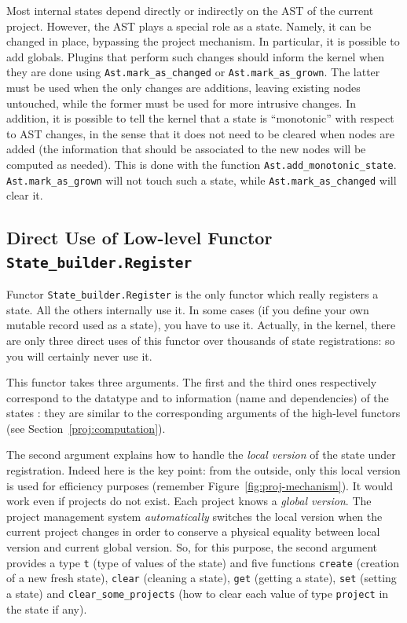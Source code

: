 Most internal states depend directly or indirectly on the AST of the current
project. However, the AST plays a special role as a state. Namely, it can be
changed in place, bypassing the project mechanism. In particular, it is possible
to add globals. Plugins that perform such changes should inform the kernel
when they are done using
\texttt{Ast.mark\_as\_changed} or 
\texttt{Ast.mark\_as\_grown}. The latter
must be used when the only changes are additions, leaving existing nodes
untouched, while the former must be used for more intrusive changes.
In addition, it is possible to tell the kernel that a state is ``monotonic''
with respect to AST changes, in the sense that it does not need to be cleared
when nodes are added (the information that should be associated to the new 
nodes will be computed as needed). This is done with the function
\texttt{Ast.add\_monotonic\_state}.
\texttt{Ast.mark\_as\_grown} will not touch such a state, while
\texttt{Ast.mark\_as\_changed} will clear it.

\subsection{Direct Use of Low-level Functor \texttt{State\_builder.Register}}
\label{proj:lowlevel}

Functor \texttt{State\_builder.Register}%
 is the only functor which really
registers a state. All the others internally use it. In some cases (\eg if you
define your own mutable record used as a state), you have to use it. Actually,
in the \framac kernel, there are only three direct uses of this
functor over thousands of state registrations: so you will certainly never use
it.

This functor takes three arguments. The first and the third ones respectively
correspond to the datatype and to information (name and
dependencies) of the states%
: they are similar to the corresponding
arguments of the high-level functors (see Section~\ref{proj:computation}).

The second argument explains how to handle the \emph{local
  version} of the state under
registration. Indeed here is the key point: from the outside, only this local
version is used for efficiency purposes (remember
Figure~\ref{fig:proj-mechanism}). It would work even if projects do not
exist. Each project knows a \emph{global version}. The project management system \emph{automatically} 
switches the local version when the current
project changes in order to conserve a physical
equality between local version and current global
version. So, for this purpose, the second argument provides a type \texttt{t}
(type of values of the state) and five functions \texttt{create} (creation of a
new fresh state), \texttt{clear} (cleaning a state), \texttt{get} (getting a
state), \texttt{set} (setting a state) and \texttt{clear\_some\_projects} (how
to clear each value of type \texttt{project} in the state if any).


